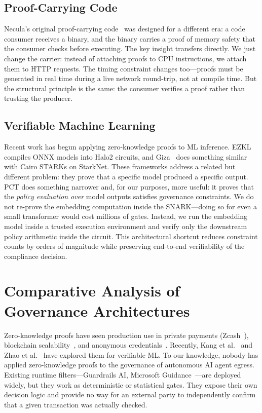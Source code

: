 \documentclass[10pt,conference]{IEEEtran}
\begin{document}
\subsection{Proof-Carrying Code}

Necula's original proof-carrying code~\cite{necula1997proof} was designed for a different era: a code consumer receives a binary, and the binary carries a proof of memory safety that the consumer checks before executing. The key insight transfers directly. We just change the carrier: instead of attaching proofs to CPU instructions, we attach them to HTTP requests. The timing constraint changes too---proofs must be generated in real time during a live network round-trip, not at compile time. But the structural principle is the same: the consumer verifies a proof rather than trusting the producer.

\subsection{Verifiable Machine Learning}

Recent work has begun applying zero-knowledge proofs to ML inference. EZKL~\cite{ezkl2023} compiles ONNX models into Halo2 circuits, and Giza~\cite{giza2023} does something similar with Cairo STARKs on StarkNet. These frameworks address a related but different problem: they prove that a specific model produced a specific output. PCT does something narrower and, for our purposes, more useful: it proves that the \emph{policy evaluation over} model outputs satisfies governance constraints. We do not re-prove the embedding computation inside the SNARK---doing so for even a small transformer would cost millions of gates. Instead, we run the embedding model inside a trusted execution environment and verify only the downstream policy arithmetic inside the circuit. This architectural shortcut reduces constraint counts by orders of magnitude while preserving end-to-end verifiability of the compliance decision.

\section{Comparative Analysis of Governance Architectures}
\label{sec:comparative}

Zero-knowledge proofs have seen production use in private payments (Zcash~\cite{sasson2014zerocash}), blockchain scalability~\cite{loopring2020}, and anonymous credentials~\cite{w3c2022vc, semaphore2020}. Recently, Kang et al.~\cite{kang2022scaling} and Zhao et al.~\cite{zhao2024verifiable} have explored them for verifiable ML. To our knowledge, nobody has applied zero-knowledge proofs to the governance of autonomous AI agent egress. Existing runtime filters---Guardrails AI, Microsoft Guidance~\cite{zheng2023llama}---are deployed widely, but they work as deterministic or statistical gates. They expose their own decision logic and provide no way for an external party to independently confirm that a given transaction was actually checked.
\end{document}
